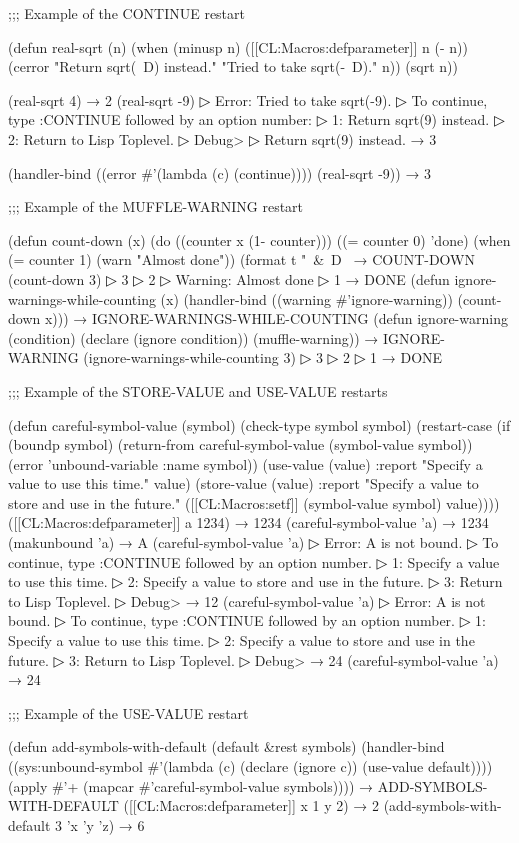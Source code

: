 ;;; Example of the CONTINUE restart

(defun real-sqrt (n) (when (minusp n) ([[CL:Macros:defparameter]] n (- n)) (cerror "Return sqrt(~D) instead." "Tried to take sqrt(-~D)." n)) (sqrt n))

(real-sqrt 4) → 2 (real-sqrt -9)
▷ Error: Tried to take sqrt(-9).
▷ To continue, type :CONTINUE followed by an option number:
▷ 1: Return sqrt(9) instead.
▷ 2: Return to Lisp Toplevel.
▷ Debug> 
▷ Return sqrt(9) instead. → 3

(handler-bind ((error #'(lambda (c) (continue)))) (real-sqrt -9)) → 3

;;; Example of the MUFFLE-WARNING restart

(defun count-down (x) (do ((counter x (1- counter))) ((= counter 0) 'done) (when (= counter 1) (warn "Almost done")) (format t "~&~D~ → COUNT-DOWN (count-down 3)
▷ 3
▷ 2
▷ Warning: Almost done
▷ 1 → DONE (defun ignore-warnings-while-counting (x) (handler-bind ((warning #'ignore-warning)) (count-down x))) → IGNORE-WARNINGS-WHILE-COUNTING (defun ignore-warning (condition) (declare (ignore condition)) (muffle-warning)) → IGNORE-WARNING (ignore-warnings-while-counting 3)
▷ 3
▷ 2
▷ 1 → DONE

;;; Example of the STORE-VALUE and USE-VALUE restarts

(defun careful-symbol-value (symbol) (check-type symbol symbol) (restart-case (if (boundp symbol) (return-from careful-symbol-value (symbol-value symbol)) (error 'unbound-variable :name symbol)) (use-value (value) :report "Specify a value to use this time." value) (store-value (value) :report "Specify a value to store and use in the future." ([[CL:Macros:setf]] (symbol-value symbol) value)))) ([[CL:Macros:defparameter]] a 1234) → 1234 (careful-symbol-value 'a) → 1234 (makunbound 'a) → A (careful-symbol-value 'a)
▷ Error: A is not bound.
▷ To continue, type :CONTINUE followed by an option number.
▷ 1: Specify a value to use this time.
▷ 2: Specify a value to store and use in the future.
▷ 3: Return to Lisp Toplevel.
▷ Debug>  → 12 (careful-symbol-value 'a)
▷ Error: A is not bound.
▷ To continue, type :CONTINUE followed by an option number.
▷ 1: Specify a value to use this time.
▷ 2: Specify a value to store and use in the future.
▷ 3: Return to Lisp Toplevel.
▷ Debug>  → 24 (careful-symbol-value 'a) → 24

;;; Example of the USE-VALUE restart

(defun add-symbols-with-default (default &rest symbols) (handler-bind ((sys:unbound-symbol #'(lambda (c) (declare (ignore c)) (use-value default)))) (apply #'+ (mapcar #'careful-symbol-value symbols)))) → ADD-SYMBOLS-WITH-DEFAULT ([[CL:Macros:defparameter]] x 1 y 2) → 2 (add-symbols-with-default 3 'x 'y 'z) → 6


